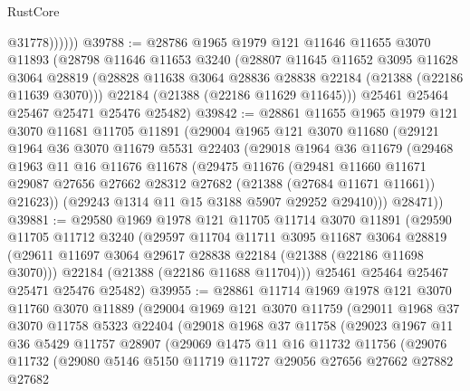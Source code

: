\begin{lexlean}{RustCore}
\begin{coremodule}
                @31778))))))
@39788 := @28786
    @1965
    @1979
    @121
    @11646
    @11655
    @3070
    @11893
    (@28798
      @11646
      @11653
      @3240
      (@28807
        @11645
        @11652
        @3095
        @11628
        @3064
        @28819
        (@28828 @11638 @3064 @28836 @28838 @22184 (@21388 (@22186 @11639 @3070)))
        @22184
        (@21388 (@22186 @11629 @11645)))
      @25461
      @25464
      @25467
      @25471
      @25476
      @25482)
@39842 := @28861
    @11655
    @1965
    @1979
    @121
    @3070
    @11681
    @11705
    @11891
    (@29004
      @1965
      @121
      @3070
      @11680
      (@29121
        @1964
        @36
        @3070
        @11679
        @5531
        @22403
        (@29018
          @1964
          @36
          @11679
          (@29468
            @1963
            @11
            @16
            @11676
            @11678
            (@29475
              @11676
              (@29481
                @11660
                @11671
                @29087
                @27656
                @27662
                @28312
                @27682
                (@21388 (@27684 @11671 @11661))
                @21623))
            (@29243 @1314 @11 @15 @3188 @5907 @29252 @29410)))
        @28471))
@39881 := @29580
    @1969
    @1978
    @121
    @11705
    @11714
    @3070
    @11891
    (@29590
      @11705
      @11712
      @3240
      (@29597
        @11704
        @11711
        @3095
        @11687
        @3064
        @28819
        (@29611 @11697 @3064 @29617 @28838 @22184 (@21388 (@22186 @11698 @3070)))
        @22184
        (@21388 (@22186 @11688 @11704)))
      @25461
      @25464
      @25467
      @25471
      @25476
      @25482)
@39955 := @28861
    @11714
    @1969
    @1978
    @121
    @3070
    @11760
    @3070
    @11889
    (@29004
      @1969
      @121
      @3070
      @11759
      (@29011
        @1968
        @37
        @3070
        @11758
        @5323
        @22404
        (@29018
          @1968
          @37
          @11758
          (@29023
            @1967
            @11
            @36
            @5429
            @11757
            @28907
            (@29069
              @1475
              @11
              @16
              @11732
              @11756
              (@29076
                @11732
                (@29080
                  @5146
                  @5150
                  @11719
                  @11727
                  @29056
                  @27656
                  @27662
                  @27882
                  @27682

\end{coremodule}
\end{lexlean}
